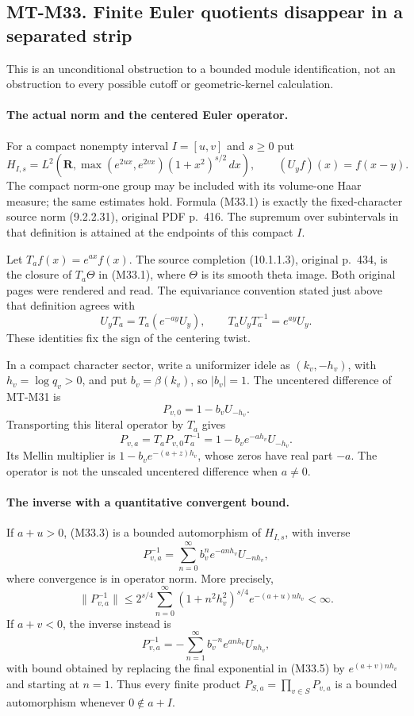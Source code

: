 \subsection*{MT-M33. Finite Euler quotients disappear in a separated strip}

This is an unconditional obstruction to a bounded module
identification, not an obstruction to every possible
cutoff or geometric-kernel calculation.

\paragraph{The actual norm and the centered Euler operator.}
For a compact nonempty interval $I=[u,v]$ and $s\geq0$ put
\[
 H_{I,s}=L^2\left(\mathbf R,
       \max(e^{2ux},e^{2vx})(1+x^2)^{s/2}\,dx\right),
 \qquad (U_yf)(x)=f(x-y).
 \tag{M33.1}
\]
The compact norm-one group may be included with its
volume-one Haar measure; the same estimates hold.
Formula (M33.1) is exactly the fixed-character source norm
(9.2.2.31), original PDF p.~416.  The supremum over
subintervals in that definition is attained at the
endpoints of this compact $I$.

Let $T_af(x)=e^{ax}f(x)$.  The source completion
(10.1.1.3), original p.~434, is the closure of
$T_a\Theta$ in (M33.1), where $\Theta$ is its smooth
theta image.  Both original pages were rendered and
read.  The equivariance convention stated just above
that definition agrees with
\[
 U_yT_a=T_a(e^{-ay}U_y),\qquad
            T_aU_yT_a^{-1}=e^{ay}U_y.
 \tag{M33.2}
\]
These identities fix the sign of the centering twist.

In a compact character sector, write a uniformizer idele
as $(k_v,-h_v)$, with $h_v=\log q_v>0$, and put
$b_v=\beta(k_v)$, so $|b_v|=1$.
The uncentered difference of MT-M31 is
\[
 P_{v,0}=1-b_vU_{-h_v}.
\]
Transporting this literal operator by $T_a$ gives
\[
 P_{v,a}=T_aP_{v,0}T_a^{-1}
                 =1-b_ve^{-ah_v}U_{-h_v}.
 \tag{M33.3}
\]
Its Mellin multiplier is
$1-b_ve^{-(a+z)h_v}$, whose zeros have real part $-a$.
The operator is not the unscaled uncentered difference
when $a\ne0$.

\paragraph{The inverse with a quantitative convergent bound.}
If $a+u>0$, (M33.3) is a bounded automorphism of
$H_{I,s}$, with inverse
\[
 P_{v,a}^{-1}
       =\sum_{n=0}^{\infty}b_v^ne^{-anh_v}U_{-nh_v},
 \tag{M33.4}
\]
where convergence is in operator norm.  More precisely,
\[
 \|P_{v,a}^{-1}\|
 \leq 2^{s/4}\sum_{n=0}^{\infty}
       (1+n^2h_v^2)^{s/4}e^{-(a+u)nh_v}<\infty.
 \tag{M33.5}
\]
If $a+v<0$, the inverse instead is
\[
 P_{v,a}^{-1}
      =-\sum_{n=1}^{\infty}b_v^{-n}e^{anh_v}U_{nh_v},
 \tag{M33.6}
\]
with bound obtained by replacing the final exponential
in (M33.5) by $e^{(a+v)nh_v}$ and starting at $n=1$.
Thus every finite product
$P_{S,a}=\prod_{v\in S}P_{v,a}$ is a bounded
automorphism whenever $0\notin a+I$.

